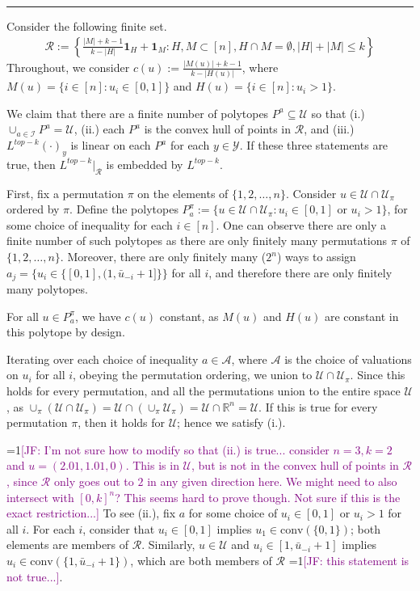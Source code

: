 \documentclass[12pt]{article}
\newcommand{\Comments}{1}
\newcommand{\mynote}[2]{\ifnum\Comments=1\textcolor{#1}{#2}\fi}
\newcommand{\jessie}[1]{\mynote{purple}{[JF: #1]}}
\newcommand{\reals}{\mathbb{R}}
\newcommand{\I}{\mathcal{I}}
\newcommand{\R}{\mathcal{R}}
\newcommand{\U}{\mathcal{U}}
\newcommand{\Y}{\mathcal{Y}}
\newcommand{\conv}{\mathrm{conv}}
\begin{document}
\bigskip
\hrule
\bigskip

Consider the following finite set.
\begin{align*}
\R := \left\{ \frac{|M| + k -1}{k - |H|} \mathbf{1}_H + \mathbf{1}_M : H, M \subset [n], H\cap M = \emptyset, |H| + |M| \leq k \right\}
\end{align*}
Throughout, we consider $c(u) := \frac{|M(u)| + k -1}{k - |H(u)|}$, where $M(u) = \{i \in [n] : u_i \in [0,1] \}$ and $H(u) = \{i \in [n] : u_i > 1\}$.

We claim that there are a finite number of polytopes $P^{a} \subseteq \U$ so that (i.) $\cup_{a \in \I} P^{a} = \U$, (ii.) each $P^{a}$ is the convex hull of points in $\R$, and (iii.) $L^{top-k}(\cdot)_y$ is linear on each $P^{a}$ for each $y \in \Y$.
If these three statements are true, then $L^{top-k}|_\R$ is embedded by $L^{top-k}$.

First, fix a permutation $\pi$ on the elements of $\{1,2,\ldots, n\}$.
Consider $u \in \U \cap \U_\pi$ ordered by $\pi$.
Define the polytopes $P^\pi_a := \{u \in \U\cap \U_\pi : u_i \in [0,1] \text{ or } u_i > 1\}$, for some choice of inequality for each $i \in [n]$.
One can observe there are only a finite number of such polytopes as there are only finitely many permutations $\pi$ of $\{1,2,\ldots, n\}$.
Moreover, there are only finitely many ($2^n$) ways to assign $a_j = \{u_i \in \{[0,1], (1, \bar u_{-i} + 1]\} \}$ for all $i$, and therefore there are only finitely many polytopes.

For all $u \in P^\pi_a$, we have $c(u)$ constant, as $M(u)$ and $H(u)$ are constant in this polytope by design.


Iterating over each choice of inequality $a \in \mathcal{A}$, where $\mathcal{A}$ is the choice of valuations on $u_i$ for all $i$, obeying the permutation ordering, we union to $\U \cap \U_\pi$.  
Since this holds for every permutation, and all the permutations union to the entire space $\U$, as $\cup_\pi(\U \cap \U_\pi) = \U \cap (\cup_\pi \U_\pi) = \U \cap \reals^n = \U$.  
If this is true for every permutation $\pi$, then it holds for $\U$; hence we satisfy (i.).

\jessie{I'm not sure how to modify so that (ii.) is true... consider $n=3, k=2$ and $u = (2.01, 1.01, 0)$.  This is in $\U$, but is not in the convex hull of points in $\R$, since $\R$ only goes out to $2$ in any given direction here.  We might need to also intersect with $[0,k]^n$?  This seems hard to prove though.  Not sure if this is the exact restriction...}
To see (ii.), fix $a$ for some choice of $u_i \in [0,1]$ or $u_i >1$ for all $i$.
For each $i$, consider that $u_i \in [0,1]$ implies $u_1 \in \conv(\{0,1\})$; both elements are members of $\R$.
Similarly, $u \in \U$ and $u_i \in [1,\bar u_{-i}+1]$ implies  $u_i \in \conv(\{1, \bar u_{-i} + 1\})$, which are both members of $\R$ \jessie{this statement is not true...}.
\end{document}
